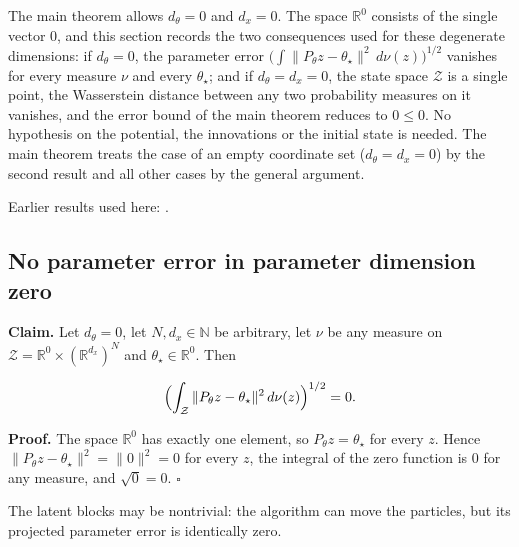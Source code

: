 \documentclass[11pt,a4paper]{report}
\begin{document}
The main theorem allows \(d_\theta=0\) and \(d_x=0\). The space \(\mathbb R^0\) consists of the single vector \(0\), and this section records the two consequences used for these degenerate dimensions: if \(d_\theta=0\), the parameter error \(\bigl(\int\|P_\theta z-\theta_\star\|^2\,d\nu(z)\bigr)^{1/2}\) vanishes for every measure \(\nu\) and every \(\theta_\star\); and if \(d_\theta=d_x=0\), the state space \(\mathcal Z\) is a single point, the Wasserstein distance between any two probability measures on it vanishes, and the error bound of the main theorem reduces to \(0\le0\). No hypothesis on the potential, the innovations or the initial state is needed. The main theorem treats the case of an empty coordinate set (\(d_\theta=d_x=0\)) by the second result and all other cases by the general argument.



Earlier results used here: \cite[Section~3.51]{LangevinLean2026ULASC}.
\subsection{\texorpdfstring{No parameter error in parameter dimension zero}{No parameter error in parameter dimension zero}}
\label{report-step-IPLA-Degenerate-lean-1}


\textbf{Claim.} Let \(d_\theta=0\), let \(N,d_x\in\mathbb N\) be arbitrary, let \(\nu\) be any measure on \(\mathcal Z=\mathbb R^0\times(\mathbb R^{d_x})^N\) and \(\theta_\star\in\mathbb R^0\). Then


\[\Bigl(\int_{\mathcal Z}\|P_\theta z-\theta_\star\|^2\,d\nu(z)\Bigr)^{1/2}=0 .\]


\textbf{Proof.} The space \(\mathbb R^0\) has exactly one element, so \(P_\theta z=\theta_\star\) for every \(z\). Hence \(\|P_\theta z-\theta_\star\|^2=\|0\|^2=0\) for every \(z\), the integral of the zero function is \(0\) for any measure, and \(\sqrt0=0\). \(\square\)




The latent blocks may be nontrivial: the algorithm can move the particles, but its projected parameter error is identically zero.
\end{document}
